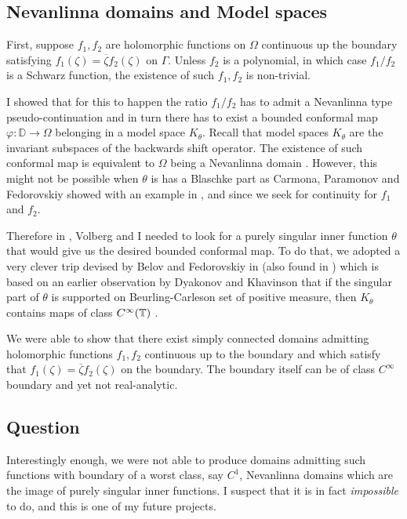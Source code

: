 \documentclass[11pt]{amsart} %
\theoremstyle{remark} %
\theoremstyle{definition} %
\numberwithin{equation}{section} %
\def \D{{\mathbb{D}}}	\def \J{{\mathbb{J}}}	\def \P{{\mathbb{P}}}	\def \V{{\mathbb{V}}}
\newcommand{\0}[1]{\overline{#1}} %
\newcommand{\1}[1]{\tilde{#1}} %
\newcommand{\2}[1]{{}_{|#1}} %
\begin{document}
\subsection{Nevanlinna domains and Model spaces}
First, suppose $f_1,f_2$ are holomorphic functions on $Ω$ continuous up the boundary satisfying $f_1(ζ)=\0{ζ}f_2(ζ)$ on $Γ$. Unless $f_2$ is a polynomial, in which case $f_1/f_2$ is a Schwarz function, the existence of such $f_1,f_2$ is non-trivial.

I showed that for this to happen the ratio $f_1/f_2$ has to admit a Nevanlinna type pseudo-continuation and in turn there has to exist a bounded conformal map $φ:\D\to Ω$ belonging in a model space $K_θ$. Recall that model spaces $K_θ$ are the invariant subspaces of the backwards shift operator. The existence of such conformal map is equivalent to $Ω$ being a Nevanlinna domain \cite{Fed2006,BarFed2011}. However, this might not be possible when $θ$ is has a Blaschke part as Carmona, Paramonov and Fedorovskiy showed with an example in \cite[Example 5.8]{CarParFed2002}, and since we seek for continuity for $f_1$ and $f_2$.

Therefore in \cite{VarVol2021ep_2022}, Volberg and I needed to look for a purely singular inner function $θ$ that would give us the desired bounded conformal map. To do that, we adopted a very clever trip devised by Belov and Fedorovskiy in \cite{BelFed2018} (also found in \cite{BarBelBorFed2017}) which is based on an earlier observation by Dyakonov and Khavinson that if the singular part of $θ$ is supported on Beurling-Carleson set of positive measure, then $K_θ$ contains maps of class $C^\infty({\mathbb{T}})$ \cite{DyaKha2006}.

We were able to show that there exist simply connected domains admitting holomorphic functions $f_1,f_2$ continuous up to the boundary and which satisfy that $f_1(ζ)=\0{ζ}f_2(ζ)$ on the boundary. The boundary itself can be of class $C^\infty$ boundary and yet not real-analytic.

\subsection*{Question} %
Interestingly enough, we were not able to produce domains admitting such functions with boundary of a worst class, say $C^1$, Nevanlinna domains which are the image of purely singular inner functions. I suspect that it is in fact \emph{impossible} to do, and this is one of my future projects.
\end{document}
